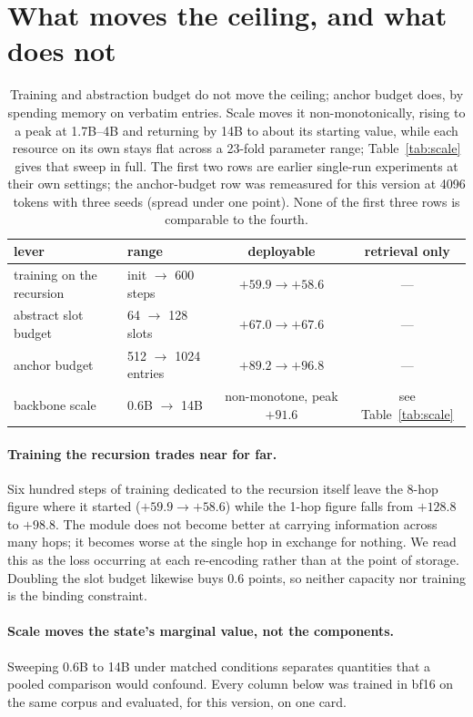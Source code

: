 \documentclass[11pt]{article}
\begin{document}
\section{What moves the ceiling, and what does not}
\label{sec:levers}

\begin{table}[ht]
\centering
\small
\begin{tabular}{llcc}
\toprule
lever & range & deployable & retrieval only \\
\midrule
training on the recursion & init $\to$ 600 steps & $+59.9 \to +58.6$ & --- \\
abstract slot budget      & 64 $\to$ 128 slots   & $+67.0 \to +67.6$ & --- \\
anchor budget             & 512 $\to$ 1024 entries & $+89.2 \to +96.8$ & --- \\
\midrule
backbone scale & 0.6B $\to$ 14B & non-monotone, peak $\mathbf{+91.6}$ & see Table~\ref{tab:scale} \\
\bottomrule
\end{tabular}
\caption{Training and abstraction budget do not move the ceiling; anchor budget
does, by spending memory on verbatim entries. Scale moves it non-monotonically,
rising to a peak at 1.7B--4B and returning by 14B to about its starting value,
while each resource on its own stays flat across a 23-fold parameter range;
Table~\ref{tab:scale} gives that sweep in full. The
first two rows are earlier single-run experiments at their own settings; the
anchor-budget row was remeasured for this version at 4096 tokens with three
seeds (spread under one point). None of the first three rows is comparable to
the fourth.}
\label{tab:levers}
\end{table}

\paragraph{Training the recursion trades near for far.}
Six hundred steps of training dedicated to the recursion itself leave the 8-hop
figure where it started ($+59.9 \to +58.6$) while the 1-hop figure falls from
$+128.8$ to $+98.8$. The module does not become better at carrying information
across many hops; it becomes worse at the single hop in exchange for nothing. We
read this as the loss occurring at each re-encoding rather than at the point of
storage. Doubling the slot budget likewise buys $0.6$ points, so neither
capacity nor training is the binding constraint.

\paragraph{Scale moves the state's marginal value, not the components.}
\label{para:scale}
Sweeping 0.6B to 14B under matched conditions separates quantities that a
pooled comparison would confound. Every column below was trained in bf16 on the
same corpus and evaluated, for this version, on one card.
\end{document}
